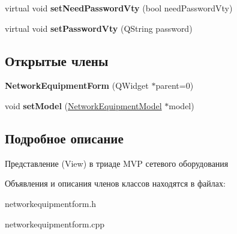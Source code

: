 \begin{DoxyCompactItemize}
\item 
virtual void {\bfseries set\+Need\+Password\+Vty} (bool need\+Password\+Vty)\hypertarget{class_network_equipment_form_a4c0fe8aa82ac42bd34f8f44f3f42e966}{}\label{class_network_equipment_form_a4c0fe8aa82ac42bd34f8f44f3f42e966}

\item 
virtual void {\bfseries set\+Password\+Vty} (Q\+String password)\hypertarget{class_network_equipment_form_a4a33264c3f13fc8795d3fce4d4a451cf}{}\label{class_network_equipment_form_a4a33264c3f13fc8795d3fce4d4a451cf}

\end{DoxyCompactItemize}
\subsection*{Открытые члены}
\begin{DoxyCompactItemize}
\item 
{\bfseries Network\+Equipment\+Form} (Q\+Widget $\ast$parent=0)\hypertarget{class_network_equipment_form_a1ee2a5fc8df7255d2887ff9a898c1139}{}\label{class_network_equipment_form_a1ee2a5fc8df7255d2887ff9a898c1139}

\item 
void {\bfseries set\+Model} (\hyperlink{class_network_equipment_model}{Network\+Equipment\+Model} $\ast$model)\hypertarget{class_network_equipment_form_a36fc9eb8d7f2a5ff79084661709a9936}{}\label{class_network_equipment_form_a36fc9eb8d7f2a5ff79084661709a9936}

\end{DoxyCompactItemize}


\subsection{Подробное описание}
Представление (View) в триаде M\+VP сетевого оборудования 

Объявления и описания членов классов находятся в файлах\+:\begin{DoxyCompactItemize}
\item 
networkequipmentform.\+h\item 
networkequipmentform.\+cpp\end{DoxyCompactItemize}

